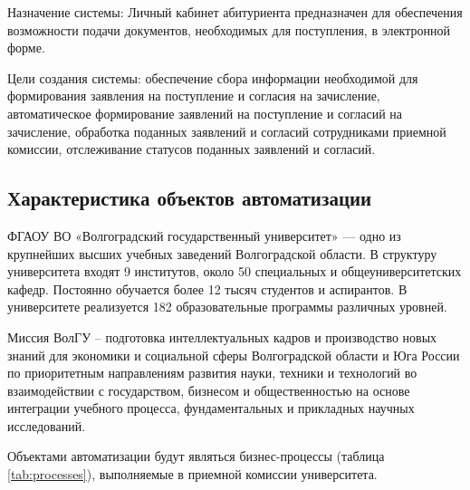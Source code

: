 Назначение системы: Личный кабинет абитуриента   предназначен для обеспечения возможности подачи документов, необходимых для поступления, в электронной форме.

Цели создания системы: обеспечение сбора информации необходимой для формирования заявления на поступление и согласия на зачисление, автоматическое формирование заявлений на поступление и согласий на зачисление, обработка поданных заявлений и согласий сотрудниками приемной комиссии, отслеживание статусов поданных заявлений и согласий.

\subsection{Характеристика объектов автоматизации}

ФГАОУ ВО «Волгоградский государственный университет» — одно из крупнейших высших учебных заведений Волгоградской области. В структуру университета входят 9 институтов, около 50 специальных и общеуниверситетских кафедр. Постоянно обучается более 12 тысяч студентов и аспирантов. В университете реализуется 182 образовательные программы различных уровней.

Миссия ВолГУ – подготовка интеллектуальных кадров и производство новых знаний для экономики и социальной сферы Волгоградской области и Юга России по приоритетным направлениям развития науки, техники и технологий во взаимодействии с государством, бизнесом и общественностью на основе интеграции учебного процесса, фундаментальных и прикладных научных исследований.

Объектами автоматизации будут являться бизнес-процессы (таблица \ref{tab:processes}), выполняемые в приемной комиссии университета.

